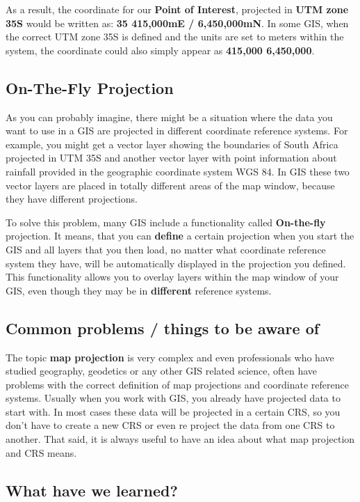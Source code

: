As a result, the coordinate for our \textbf{Point of Interest}, projected in
\textbf{UTM zone 35S} would be written as: \textbf{35 415,000mE /
6,450,000mN}. In some GIS, when the
correct UTM zone 35S is defined and the units are set to meters within the
system, the coordinate could also simply appear as \textbf{415,000 6,450,000}.

\subsection{On-The-Fly Projection}

As you can probably imagine, there might be a situation where the data you
want to use in a GIS are projected in different coordinate reference systems.
For example, you might get a vector layer showing the boundaries of South
Africa projected in UTM 35S and another vector layer with point information
about rainfall provided in the geographic coordinate system WGS 84. In GIS
these  two vector layers are placed in totally different areas of the map
window, because they have different projections.

To solve this problem, many GIS include a functionality called
\textbf{On-the-fly} projection. It means, that you can \textbf{define} a
certain projection when you start
the GIS and all layers that you then load, no matter what coordinate
reference system they have, will be automatically displayed in the projection
you defined. This functionality allows you to overlay layers within the map
window of your GIS, even though they may be in \textbf{different} reference
systems.

\subsection{Common problems / things to be aware of}

The topic \textbf{map projection} is very complex and even professionals who have
studied geography, geodetics or any other GIS related science, often have
problems with the correct definition of map projections and coordinate
reference systems. Usually when you work with GIS, you already have projected
data to start with. In most cases these data will be projected in a certain
CRS, so you don't have to create a new CRS or even re project the data from
one CRS to another. That said, it is always useful to have an idea about what
map projection and CRS means. 

\subsection{What have we learned?}

